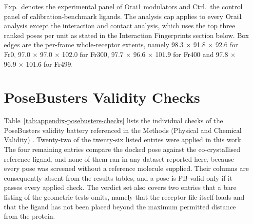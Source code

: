 Exp.~denotes the experimental panel of Orai1 modulators and Ctrl.~the control panel of calibration-benchmark ligands. The analysis cap applies to every Orai1 analysis except the interaction and contact analysis, which uses the top three ranked poses per unit as stated in the Interaction Fingerprints section below. Box edges are the per-frame whole-receptor extents, namely 98.3 \ensuremath{\times} 91.8 \ensuremath{\times} 92.6 \angstrom{} for Fr0, 97.0 \ensuremath{\times} 97.0 \ensuremath{\times} 102.0 \angstrom{} for Fr300, 97.7 \ensuremath{\times} 96.6 \ensuremath{\times} 101.9 \angstrom{} for Fr400 and 97.8 \ensuremath{\times} 96.9 \ensuremath{\times} 101.6 \angstrom{} for Fr499.

\hypertarget{posebusters-validity-checks}{%
\section{PoseBusters Validity Checks}\label{posebusters-validity-checks}}

Table~\ref{tab:appendix-posebusters-checks} lists the individual checks of the PoseBusters validity battery referenced in the Methods (Physical and Chemical Validity) \cite{ref035}. Twenty-two of the twenty-six listed entries were applied in this work. The four remaining entries compare the docked pose against the co-crystallised reference ligand, and none of them ran in any dataset reported here, because every pose was screened without a reference molecule supplied. Their columns are consequently absent from the results tables, and a pose is PB-valid only if it passes every applied check. The verdict set also covers two entries that a bare listing of the geometric tests omits, namely that the receptor file itself loads and that the ligand has not been placed beyond the maximum permitted distance from the protein.

